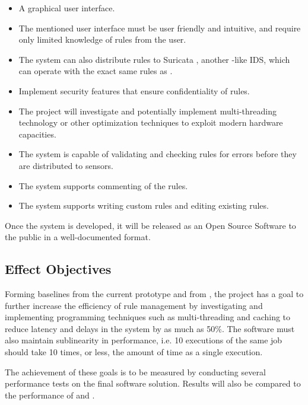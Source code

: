 \begin{itemize}
\item A graphical user interface.
\item The mentioned user interface must be user friendly and intuitive, and
require only limited knowledge of \snort{} rules from the user.
\item The system can also distribute rules to
Suricata \cite{surikata}, another \snort{}-like IDS, which
can operate with the exact same rules as \snort{}.
\item Implement security features that ensure confidentiality of rules.
\item The project will investigate and potentially implement multi-threading
technology or other optimization techniques to exploit modern hardware
capacities.
\item The system is capable of validating and checking rules for errors before
they are distributed to sensors.
\item The system supports commenting of the rules.
\item The system supports writing custom rules and editing existing rules.
\end{itemize}
Once the system is developed, it will be released as an Open Source Software to
the public in a well-documented format.
\subsection{Effect Objectives}
\label{sect:effect_objectives}

Forming baselines from the current prototype \bhtb{} and from \snortmanager{},
the project has a goal to further increase the efficiency of rule management by
investigating and implementing programming techniques such as multi-threading
and caching to reduce latency and delays in the system by as much as 50\%. The
software must also maintain sublinearity in performance, i.e. 10 executions of
the same job should take 10 times, or less, the amount of time as a single
execution.

The achievement of these goals is to be measured by conducting several
performance tests on the final software solution. Results will also be compared
to the performance of \bhtb{} and \snortmanager{}.
